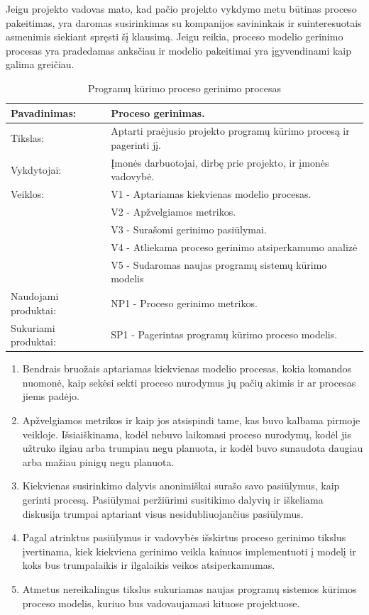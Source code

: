 \documentclass{VUMIFPSkursinis}
\begin{document}
				Jeigu projekto vadovas mato, kad pačio projekto vykdymo metu būtinas proceso pakeitimas, yra daromas susirinkimas su kompanijos savininkais ir suinteresuotais asmenimis siekiant spręsti šį klausimą. 
				Jeigu reikia, proceso modelio gerinimo procesas yra pradedamas anksčiau ir modelio pakeitimai yra įgyvendinami kaip galima greičiau.

\pagebreak
	\begin{center}
		\begin{table}[ht]
			\caption{Programų kūrimo proceso gerinimo procesas}
			\begin{tabular}{ | l | l | }
				\hline
				Pavadinimas:		& Proceso gerinimas.						\\ \hline
				Tikslas:		& Aptarti praėjusio projekto programų kūrimo procesą ir pagerinti jį.			\\ \hline
				Vykdytojai:		& Įmonės darbuotojai, dirbę prie projekto, ir įmonės vadovybė.					\\ \hline
				Veiklos:		& V1 - Aptariamas kiekvienas modelio procesas. 				\\
							& V2 - Apžvelgiamos metrikos.	\\
							& V3 - Surašomi gerinimo pasiūlymai.				\\ 
							& V4 - Atliekama proceso gerinimo atsiperkamumo analizė \\ 
							& V5 - Sudaromas naujas programų sistemų kūrimo modelis \\ \hline
				Naudojami produktai:	& NP1 - Proceso gerinimo metrikos. 				\\ \hline
				Sukuriami produktai:	& SP1 - Pagerintas programų kūrimo proceso modelis.		\\ \hline
			\end{tabular}
		\end{table}
	\end{center}

	\begin{enumerate}
		\item{Bendrais bruožais aptariamas kiekvienas modelio procesas, kokia komandos nuomonė, kaip sekėsi sekti proceso nurodymus jų pačių akimis ir ar procesas jiems padėjo.}
		\item{Apžvelgiamos metrikos ir kaip jos atsispindi tame, kas buvo kalbama pirmoje veikloje. 
			Išsiaiškinama, kodėl nebuvo laikomasi proceso nurodymų, kodėl jis užtruko ilgiau arba trumpiau negu planuota, ir kodėl buvo sunaudota daugiau arba mažiau pinigų negu planuota.}
		\item{Kiekvienas susirinkimo dalyvis anonimiškai surašo savo pasiūlymus, kaip gerinti procesą.
			Pasiūlymai peržiūrimi susitikimo dalyvių ir iškeliama diskusija trumpai aptariant visus nesidubliuojančius pasiūlymus.}
		\item{Pagal atrinktus pasiūlymus ir vadovybės išskirtus proceso gerinimo tikslus įvertinama, kiek kiekviena gerinimo veikla kainuos implementuoti į modelį ir koks bus trumpalaikis ir ilgalaikis veikos atsiperkamumas.}
		\item{Atmetus nereikalingus tikslus sukuriamas naujas programų sistemos kūrimos proceso modelis, kuriuo bus vadovaujamasi kituose projektuose.}
	\end{enumerate}
\end{document}
